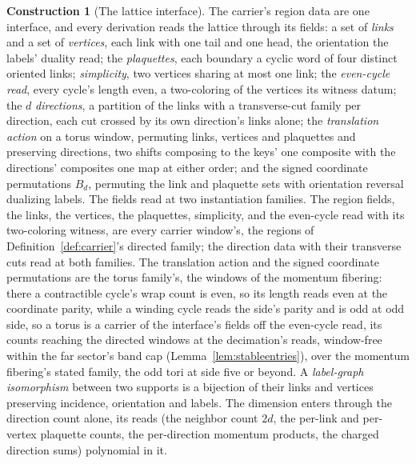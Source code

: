 \documentclass[11pt]{article}
\theoremstyle{definition}
\newtheorem{construction}{Construction}
\begin{document}
\begin{construction}[The lattice interface]\label{con:lattice}
The carrier's region data are one interface, and every derivation
reads the lattice through its fields: a set of \emph{links} and a set
of \emph{vertices}, each link with one tail and one head, the
orientation the labels' duality read; the
\emph{plaquettes}, each boundary a cyclic word of four distinct
oriented links; \emph{simplicity}, two vertices sharing at most one link; the
\emph{even-cycle read}, every cycle's length even, a two-coloring of
the vertices its witness datum; the $d$ \emph{directions}, a
partition of the links with a transverse-cut family per direction,
each cut crossed by its own direction's links alone; the
\emph{translation action} on a
torus window, permuting links, vertices and plaquettes and preserving
directions, two shifts composing to the keys' one composite with
the directions' composites one map at either order; and the signed coordinate
permutations $B_d$, permuting the link and plaquette sets with
orientation reversal dualizing labels. The fields read at two
instantiation families. The region fields, the links, the vertices,
the plaquettes, simplicity, and the even-cycle read with its
two-coloring witness, are every carrier window's, the regions of
Definition~\ref{def:carrier}'s directed family; the direction data
with their transverse cuts read at both families. The translation
action and the signed coordinate permutations are the torus
family's, the windows of the momentum fibering: there a
contractible cycle's wrap count is even, so its length reads even
at the coordinate parity, while a winding cycle reads the side's
parity and is odd at odd side, so a torus is a carrier of the
interface's fields off the even-cycle read, its counts reaching the
directed windows at the decimation's reads, window-free within the
far sector's band cap (Lemma~\ref{lem:stableentries}), over the momentum fibering's stated
family, the odd tori at side five or beyond. A \emph{label-graph isomorphism}
between two supports is a bijection of their links and vertices
preserving incidence, orientation and labels. The
dimension enters through the direction count alone, its reads (the
neighbor count $2d$, the per-link and per-vertex plaquette
counts, the per-direction momentum products, the
charged direction sums) polynomial in it.
\end{construction}
\end{document}
